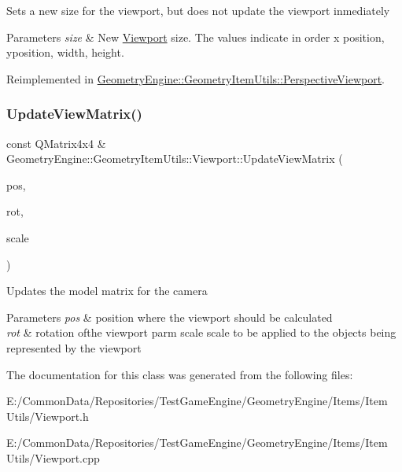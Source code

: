 Sets a new size for the viewport, but does not update the viewport inmediately 
\begin{DoxyParams}{Parameters}
{\em size} & New \mbox{\hyperlink{class_geometry_engine_1_1_geometry_item_utils_1_1_viewport}{Viewport}} size. The values indicate in order x position, yposition, width, height. \\
\hline
\end{DoxyParams}


Reimplemented in \mbox{\hyperlink{class_geometry_engine_1_1_geometry_item_utils_1_1_perspective_viewport_a01764cc11407ed9ce70111a627c823ae}{Geometry\+Engine\+::\+Geometry\+Item\+Utils\+::\+Perspective\+Viewport}}.

\mbox{\label{class_geometry_engine_1_1_geometry_item_utils_1_1_viewport_a3a6f1e8286670aa78e21631e6f3ca80b}} 
\subsubsection{\texorpdfstring{UpdateViewMatrix()}{UpdateViewMatrix()}}
{\footnotesize\ttfamily const Q\+Matrix4x4 \& Geometry\+Engine\+::\+Geometry\+Item\+Utils\+::\+Viewport\+::\+Update\+View\+Matrix (\begin{DoxyParamCaption}\item[{const Q\+Vector3D \&}]{pos,  }\item[{const Q\+Quaternion \&}]{rot,  }\item[{const Q\+Vector3D \&}]{scale }\end{DoxyParamCaption})\hspace{0.3cm}{\ttfamily [virtual]}}

Updates the model matrix for the camera 
\begin{DoxyParams}{Parameters}
{\em pos} & position where the viewport should be calculated \\
\hline
{\em rot} & rotation ofthe viewport parm scale scale to be applied to the objects being represented by the viewport \\
\hline
\end{DoxyParams}


The documentation for this class was generated from the following files\+:\begin{DoxyCompactItemize}
\item 
E\+:/\+Common\+Data/\+Repositories/\+Test\+Game\+Engine/\+Geometry\+Engine/\+Items/\+Item Utils/Viewport.\+h\item 
E\+:/\+Common\+Data/\+Repositories/\+Test\+Game\+Engine/\+Geometry\+Engine/\+Items/\+Item Utils/Viewport.\+cpp\end{DoxyCompactItemize}
